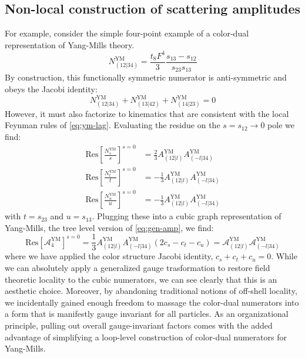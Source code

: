 \documentclass[11pt,letter]{article}
\begin{document}
\subsection{Non-local construction of scattering amplitudes}
\label{nonLocalScattering}
For example, consider the simple four-point example of a color-dual
representation of Yang-Mills theory.
\begin{equation}
N_{(12|34)}^{\text{YM}} = \frac{t_8F^4}{3} \frac{s_{13}-s_{12}}{s_{23}{s_{13}}}
\end{equation}
By construction, this functionally symmetric numerator is
anti-symmetric and obeys the Jacobi identity:
\begin{equation}
N_{(12|34)}^{\text{YM}} + N_{(13|42)}^{\text{YM}} +N_{(14|23)}^{\text{YM}} = 0
\end{equation}
However, it must also factorize to kinematics that are consistent with
the local Feynman rules of \cref{eq:ym-lag}. Evaluating the residue on
the $s=s_{12} \to 0$ pole we find:
\begin{align}
\text{Res}\left[\frac{ N_{s}^{\text{YM}} }{s}\right]^{s=0}&= \frac{2}{3}A_{(12|l)}^{\text{YM}}A_{(-l|34)}^{\text{YM}} 
\\
\text{Res}\left[\frac{N_{t}^{\text{YM}} }{t}\right]^{s=0}&= -\frac{1}{3}A_{(12|l)}^{\text{YM}}A_{(-l|34)}^{\text{YM}} 
\\
\text{Res}\left[\frac{N_{u}^{\text{YM}} }{u}\right]^{s=0}&= -\frac{1}{3} A_{(12|l)}^{\text{YM}}A_{(-l|34)}^{\text{YM}} 
\end{align}
with $t=s_{23}$ and $u=s_{13}$.
Plugging these into a cubic graph representation of Yang-Mills, the
tree level version of \cref{eq:gen-amp}, we find:
\begin{equation}
  \text{Res}\left[\mathcal{A}_4^{\text{YM}}\right]^{s=0}
  = \frac{1}{3} A_{(12|l)}^{\text{YM}}A_{(-l|34)}^{\text{YM}} (2c_s-c_t-c_u)
  =  \mathcal{A}_{(12|l)}^{\text{YM}}\mathcal{A}_{(-l|34)}^{\text{YM}} 
\end{equation}
where we have applied the color structure Jacobi identity,
$c_s+c_t+c_u=0$. While we can absolutely apply a generalized gauge
trasformation \cite{BCJ} to restore field theoretic locality to the
cubic numerators, we can see clearly that this is an aesthetic
choice. Moreover, by abandoning traditional notions of off-shell
locality, we incidentally gained enough freedom to massage the
color-dual numerators into a form that is manifestly gauge invariant
for all particles. As an organizational principle, pulling out overall
gauge-invariant factors comes with the added advantage of simplifying
a loop-level construction of color-dual numerators for Yang-Mills.
\end{document}

